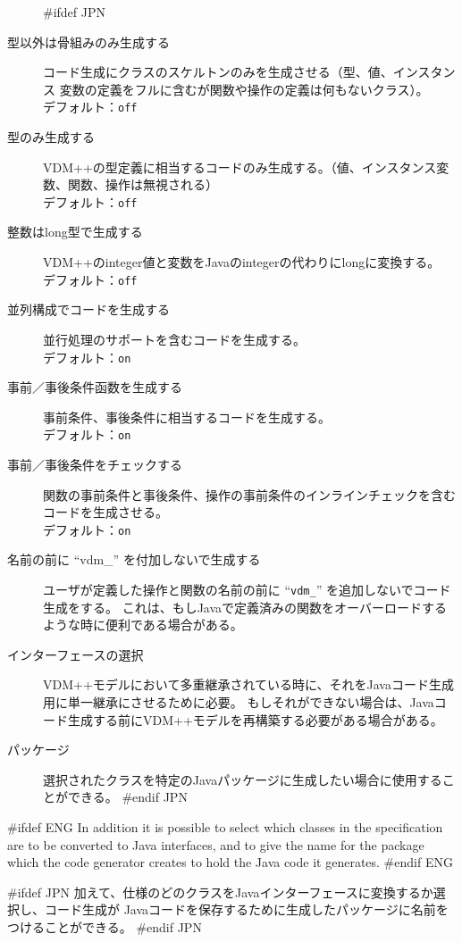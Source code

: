 \documentclass[\pformat,12pt]{article}
\begin{document}
\begin{description}
#ifdef JPN
\item[型以外は骨組みのみ生成する]
  コード生成にクラスのスケルトンのみを生成させる（型、値、インスタンス
  変数の定義をフルに含むが関数や操作の定義は何もないクラス）。 \\
  デフォルト：\texttt{off}
\item[型のみ生成する]
  VDM++の型定義に相当するコードのみ生成する。（値、インスタンス変数、関数、操作は無視される） \\
  デフォルト：\texttt{off}
\item[整数はlong型で生成する]
  VDM++のinteger値と変数をJavaのintegerの代わりにlongに変換する。 \\
  デフォルト：\texttt{off}
\item[並列構成でコードを生成する]
  並行処理のサポートを含むコードを生成する。 \\
  デフォルト：\texttt{on}
\item[事前／事後条件函数を生成する]
  事前条件、事後条件に相当するコードを生成する。 \\
  デフォルト：\texttt{on}
\item[事前／事後条件をチェックする]
  関数の事前条件と事後条件、操作の事前条件のインラインチェックを含むコードを生成させる。 \\
  デフォルト：\texttt{on}
\item[名前の前に ``vdm\_'' を付加しないで生成する]
  ユーザが定義した操作と関数の名前の前に ``\texttt{vdm\_}'' を追加しないでコード生成をする。
  これは、もしJavaで定義済みの関数をオーバーロードするような時に便利である場合がある。
\item[インターフェースの選択]
  VDM++モデルにおいて多重継承されている時に、それをJavaコード生成用に単一継承にさせるために必要。
  もしそれができない場合は、Javaコード生成する前にVDM++モデルを再構築する必要がある場合がある。
\item[パッケージ]
  選択されたクラスを特定のJavaパッケージに生成したい場合に使用することができる。
#endif JPN
\end{description}

#ifdef ENG
In addition it is possible to select which classes in the
specification are to be converted to Java interfaces, and to give the
name for the package which the code generator creates to hold the Java
code it generates.
#endif ENG

#ifdef JPN
加えて、仕様のどのクラスをJavaインターフェースに変換するか選択し、コード生成が
Javaコードを保存するために生成したパッケージに名前をつけることができる。
#endif JPN
\end{document}
